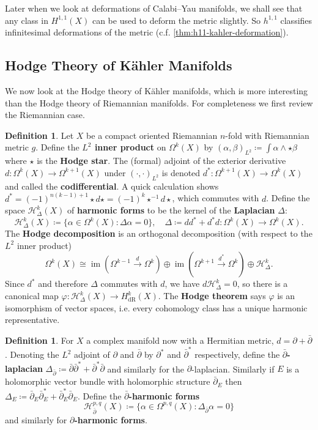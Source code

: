 \documentclass{report}
\theoremstyle{plain}
\theoremstyle{definition}
\newtheorem{definition}[theorem]{Definition}
\theoremstyle{remark}
\newcommand{\di}{\partial}
\newcommand{\cH}{\mathcal{H}}
\DeclareMathOperator{\im}{im}
\newcommand{\dR}{\mathrm{dR}}
\newcommand{\bdi}{\bar{\di}}
\begin{document}
Later when we look at deformations of Calabi--Yau manifolds, we shall
see that any class in $H^{1,1}(X)$ can be used to deform the metric
slightly. So $h^{1,1}$ classifies infinitesimal deformations of the
metric (c.f. \ref{thm:h11-kahler-deformation}).

\subsection{Hodge Theory of K\"ahler Manifolds}

We now look at the Hodge theory of K\"ahler manifolds, which is more
interesting than the Hodge theory of Riemannian manifolds. For
completeness we first review the Riemannian case.

\begin{definition}
  Let $X$ be a compact oriented Riemannian $n$-fold with Riemannian
  metric $g$. Define the {\bf $L^2$ inner product} on $\Omega^k(X)$ by
  $(\alpha, \beta)_{L^2} \coloneqq \int \alpha \wedge \star \beta$
  where $\star$ is the {\bf Hodge star}. The (formal) adjoint of the
  exterior derivative $d\colon \Omega^k(X) \to \Omega^{k+1}(X)$ under
  $(\cdot, \cdot)_{L^2}$ is denoted $d^*\colon \Omega^{k+1}(X) \to
  \Omega^k(X)$ and called the {\bf codifferential}. A quick
  calculation shows $d^* = (-1)^{n(k-1)+1}\star d \star = (-1)^k
  \star^{-1} d \star$, which commutes with $d$. Define the space
  $\cH^k_\Delta(X)$ of {\bf harmonic forms} to be the kernel of the
       {\bf Laplacian} $\Delta$:
  \[ \cH^k_\Delta(X) \coloneqq \{\alpha \in \Omega^k(X) : \Delta \alpha = 0\}, \quad \Delta \coloneqq dd^* + d^*d\colon \Omega^k(X) \to \Omega^k(X). \]
  The {\bf Hodge decomposition} is an orthogonal decomposition (with
  respect to the $L^2$ inner product)
  \[ \Omega^k(X) \cong \im(\Omega^{k-1} \xrightarrow{d} \Omega^k) \oplus \im(\Omega^{k+1} \xrightarrow{d^*} \Omega^k) \oplus \cH^k_{\Delta}. \]
  Since $d^*$ and therefore $\Delta$ commutes with $d$, we have
  $d\cH^k_\Delta = 0$, so there is a canonical map $\varphi\colon
  \cH^k_\Delta(X) \to H^k_{\dR}(X)$. The {\bf Hodge theorem} says
  $\varphi$ is an isomorphism of vector spaces, i.e. every cohomology
  class has a unique harmonic representative.
\end{definition}

\begin{definition}
  For $X$ a complex manifold now with a Hermitian metric, $d = \di +
  \bdi$. Denoting the $L^2$ adjoint of $\di$ and $\bdi$ by $\di^*$ and
  $\bdi^*$ respectively, define the {\bf $\bdi$-laplacian}
  $\Delta_{\bdi} \coloneqq \bdi \bdi^* + \bdi^* \bdi$ and similarly
  for the $\di$-laplacian. Similarly if $E$ is a holomorphic vector
  bundle with holomorphic structure $\bdi_E$ then $\Delta_E \coloneqq
  \bdi_E \bdi_E^* + \bdi_E^* \bdi_E$. Define the {\bf $\bdi$-harmonic
    forms}
  \[ \cH^{p,q}_{\bdi}(X) \coloneqq \{\alpha \in \Omega^{p,q}(X) : \Delta_{\bdi}\alpha = 0\} \]
  and similarly for {\bf $\di$-harmonic forms}.
\end{definition}
\end{document}
